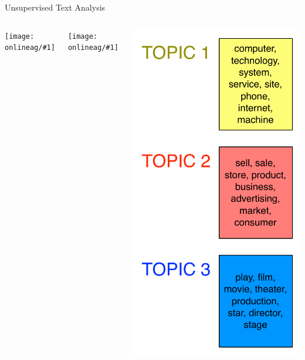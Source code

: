 \documentclass[compress]{beamer}
\newcommand{\gfxag}[2]{\begin{center}
    \texttt{[image: onlineag/\#1]}
\end{center}
}
\begin{document}
\begin{frame}{Unsupervised Text Analysis}

  \begin{columns}
      \gfxag{chinese}{.9}
      \gfxag{white_house}{.9}
       \begin{center}
         \includegraphics[width=.9\linewidth]{topic_models/nyt_topics}
       \end{center}
  \end{columns}


\end{frame}
\end{document}
